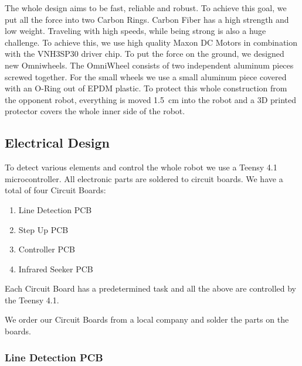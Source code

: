 The whole design aims to be fast, reliable and robust. To achieve this goal, we put all the force
into two Carbon Rings. Carbon Fiber has a high strength and low weight.
\newline
Traveling with high speeds, while being strong is also a huge challenge. To achieve this, we use high quality
Maxon DC Motors in combination with the VNH3SP30 driver chip. To put the force on the ground, we designed
new Omniwheels.
The OmniWheel consists of two independent aluminum pieces screwed together. For the small wheels we use a small
aluminum piece covered with an O-Ring out of EPDM plastic.
\newline
To protect this whole construction from the opponent robot, everything is moved 1.5 cm into the robot and a 3D
printed protector covers the whole inner side of the robot.
\newline

\subsection{Electrical Design}
To detect various elements and control the whole robot we use a Teensy 4.1 microcontroller. All electronic
parts are soldered to circuit boards.
\newline
We have a total of four Circuit Boards:
\begin{enumerate}
    \item{Line Detection PCB} \label{PCB:LD}
    \item{Step Up PCB} \label{PCB:SU}
    \item{Controller PCB} \label{PCB:C}
    \item{Infrared Seeker PCB} \label{PCB:IS}
\end{enumerate}
Each Circuit Board has a predetermined task and all the above are controlled by the Teensy 4.1.

We order our Circuit Boards from a local company and solder the parts on the boards.

\subsubsection{Line Detection PCB}

